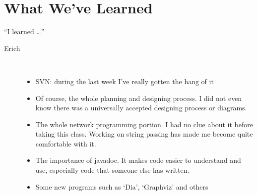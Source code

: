 \part{What We've Learned}

{\Large ``I learned \ldots''} ~\\

	\begin{description}
		
		\item[Erich] ~\\
			\begin{itemize}
				\item  SVN: during the last week I've really gotten the hang of it
				\item  Of course, the whole planning and designing process. I did not even know there was a universally accepted designing process or diagrams.
				\item  The whole network programming portion. I had no clue about it before taking this class. Working on string passing has made me become quite comfortable with it.
				\item  The importance of javadoc. It makes code easier to understand and use, especially code that someone else has written.
				\item  Some new programs such as `Dia', `Graphviz' and others
			\end{itemize}


\end{description}

